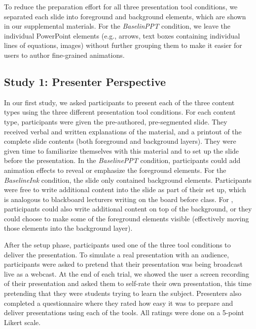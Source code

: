 To reduce the preparation effort for all three presentation tool conditions, we separated each slide into foreground and background elements, which are shown in our supplemental materials. For the \textit{BaselinPPT} condition, we leave the individual PowerPoint elements (e.g., arrows, text boxes containing individual lines of equations, images) without further grouping them to make it easier for users to author fine-grained animations. 
%

\subsection{Study 1: Presenter Perspective}
In our first study, we asked participants to present each of the three content types using the three different presentation tool conditions. 
%
For each content type, participants were given the pre-authored, pre-segmented slide. 
They received verbal and written explanations of the material, and a printout of the complete slide contents (both foreground and background layers). They were given time to familiarize themselves with this material and to set up the slide before the presentation.
%
In the \textit{BaselinePPT} condition, participants could add animation effects to reveal or emphasize the foreground elements. For the \textit{BaselineInk} condition, the slide only contained background elements. Participants were free to write additional content into the slide as part of their set up, which is analogous to blackboard lecturers writing on the board before class. For \interface, participants could also write additional content on top of the background, or they could choose to make some of the foreground elements visible (effectively moving those elements into the background layer). 

After the setup phase, participants used one of the three tool conditions to deliver the presentation. 
%
To simulate a real presentation with an audience, participants were asked to pretend that their presentation was being broadcast live as a webcast. At the end of each trial, we showed the user a screen recording of their presentation and asked them to self-rate their own presentation, this time pretending that they were students trying to learn the subject. Presenters also completed a questionnaire where they rated how easy it was to prepare and deliver presentations using each of the tools. All ratings were done on a 5-point Likert scale.

